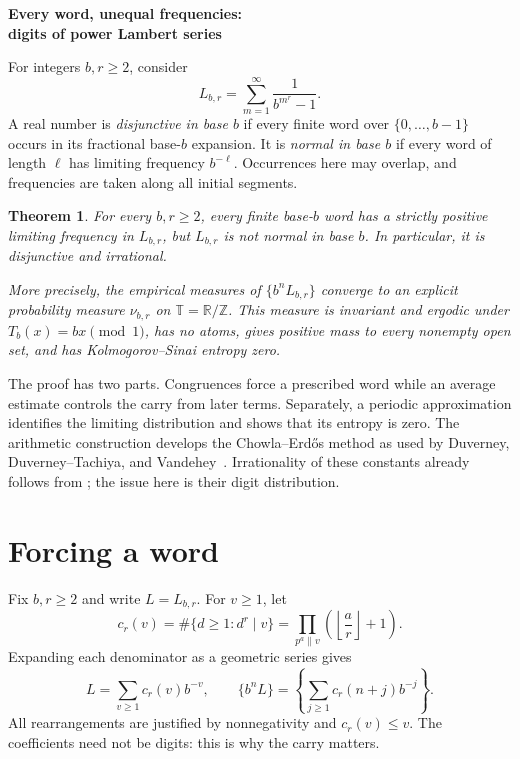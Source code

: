 \documentclass[11pt]{article}
\newcommand{\T}{\mathbb T}
\newcommand{\Z}{\mathbb Z}
\newtheorem{theorem}{Theorem}
\begin{document}
\begin{center}
{\Large\bfseries Every word, unequal frequencies:\\[3pt]
digits of power Lambert series}
\end{center}
\vspace{3pt}

For integers $b,r\ge2$, consider
\[
L_{b,r}=\sum_{m=1}^{\infty}\frac{1}{b^{m^r}-1}.
\]
A real number is \emph{disjunctive in base $b$} if every finite word over
$\{0,\ldots,b-1\}$ occurs in its fractional base-$b$ expansion. It is
\emph{normal in base $b$} if every word of length $\ell$ has limiting
frequency $b^{-\ell}$. Occurrences here may overlap, and frequencies are
taken along all initial segments.

\begin{theorem}\label{thm:main}
For every $b,r\ge2$, every finite base-$b$ word has a strictly positive
limiting frequency in $L_{b,r}$, but $L_{b,r}$ is not normal in base $b$.
In particular, it is disjunctive and irrational.

More precisely, the empirical measures of $\{b^nL_{b,r}\}$ converge to an
explicit probability measure $\nu_{b,r}$ on $\T=\mathbb R/\Z$.
This measure is invariant and ergodic under $T_b(x)=bx\pmod1$, has no
atoms, gives positive mass to every nonempty open set, and has
Kolmogorov--Sinai entropy zero.
\end{theorem}

The proof has two parts. Congruences force a prescribed word while an
average estimate controls the carry from later terms. Separately, a
periodic approximation identifies the limiting distribution and shows
that its entropy is zero. The arithmetic construction develops the
Chowla--Erd\H{o}s method as used by Duverney, Duverney--Tachiya, and
Vandehey~\cite{Duverney,DT,Vandehey}. Irrationality of these constants
already follows from \cite[Corollary 1.2]{DT}; the issue here is their
digit distribution.

\section{Forcing a word}

Fix $b,r\ge2$ and write $L=L_{b,r}$. For $v\ge1$, let
\[
c_r(v)=\#\{d\ge1:d^r\mid v\}
      =\prod_{p^a\parallel v}\left(\left\lfloor\frac a r\right\rfloor+1\right).
\]
Expanding each denominator as a geometric series gives
\begin{equation}\label{eq:carry}
L=\sum_{v\ge1}c_r(v)b^{-v},\qquad
\{b^nL\}=\left\{\sum_{j\ge1}c_r(n+j)b^{-j}\right\}.
\end{equation}
All rearrangements are justified by nonnegativity and $c_r(v)\le v$.
The coefficients need not be digits: this is why the carry matters.
\end{document}
